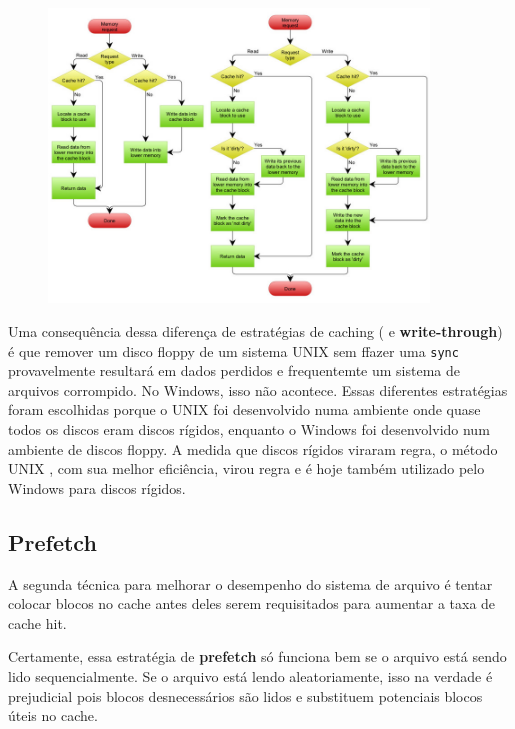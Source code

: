 \documentclass{article}
\newcommand\unix{{\color{red}UNIX} }
\begin{document}
\begin{figure}[h]
  \begin{center}
    \includegraphics[width=0.9\textwidth]{img/cache.jpg}
  \end{center}
  \caption{}
  \label{fig:}
\end{figure}



Uma consequência dessa diferença de estratégias de caching ( e \textbf{write-through}) é que remover um disco floppy de um sistema \unix sem ffazer uma \verb|sync| provavelmente resultará em dados perdidos e frequentemte um sistema de arquivos corrompido. No Windows, isso não acontece. Essas diferentes estratégias foram escolhidas porque o \unix foi desenvolvido numa ambiente onde quase todos os discos eram discos rígidos, enquanto o Windows foi desenvolvido num ambiente de discos floppy. A medida que discos rígidos viraram regra, o método \unix, com sua melhor eficiência, virou regra e é hoje também utilizado pelo Windows para discos rígidos.

\subsection{Prefetch}

A segunda técnica para melhorar o desempenho do sistema de arquivo é tentar colocar blocos no cache antes deles serem requisitados para aumentar a taxa de cache hit.

Certamente, essa estratégia de \textbf{prefetch} só funciona bem se o arquivo está sendo lido sequencialmente. Se o arquivo está lendo aleatoriamente, isso na verdade é prejudicial pois blocos desnecessários são lidos e substituem potenciais blocos úteis no cache.
\end{document}
